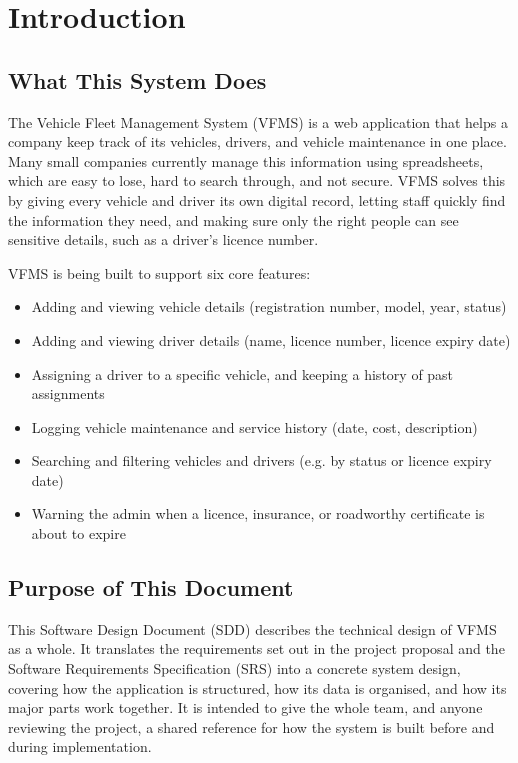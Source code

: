 \documentclass[11pt,a4paper]{article}
\begin{document}
\clearpage
\tableofcontents
\newpage

\section{Introduction}

\subsection{What This System Does}
The Vehicle Fleet Management System (VFMS) is a web application that helps a company keep track of its vehicles, drivers, and vehicle maintenance in one place. Many small companies currently manage this information using spreadsheets, which are easy to lose, hard to search through, and not secure. VFMS solves this by giving every vehicle and driver its own digital record, letting staff quickly find the information they need, and making sure only the right people can see sensitive details, such as a driver's licence number.

VFMS is being built to support six core features:
\begin{itemize}
    \item Adding and viewing vehicle details (registration number, model, year, status)
    \item Adding and viewing driver details (name, licence number, licence expiry date)
    \item Assigning a driver to a specific vehicle, and keeping a history of past assignments
    \item Logging vehicle maintenance and service history (date, cost, description)
    \item Searching and filtering vehicles and drivers (e.g. by status or licence expiry date)
    \item Warning the admin when a licence, insurance, or roadworthy certificate is about to expire
\end{itemize}

\subsection{Purpose of This Document}
This Software Design Document (SDD) describes the technical design of VFMS as a whole. It translates the requirements set out in the project proposal and the Software Requirements Specification (SRS) into a concrete system design, covering how the application is structured, how its data is organised, and how its major parts work together. It is intended to give the whole team, and anyone reviewing the project, a shared reference for how the system is built before and during implementation.
\end{document}

